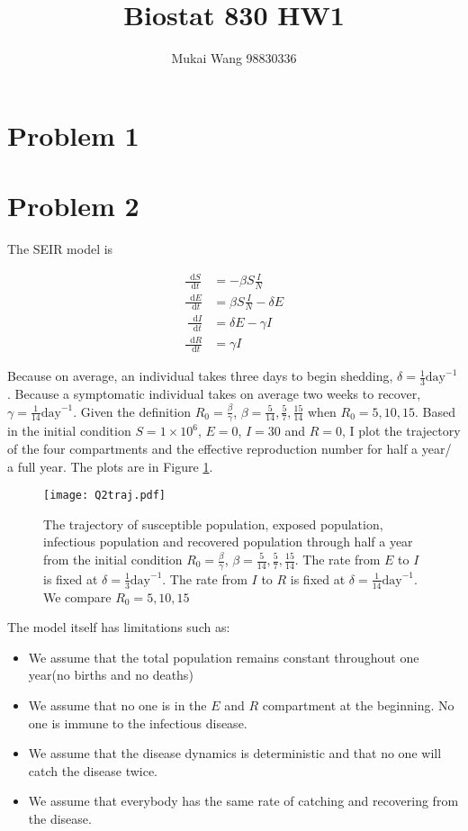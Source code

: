 \documentclass[12pt]{article}
\title{Biostat 830 HW1}
\date{}
\author{Mukai Wang 98830336}
\newcommand*\diff{\mathop{}\!\mathrm{d}}
\begin{document}
\maketitle

\section*{Problem 1}

\section*{Problem 2}

The SEIR model is

\begin{align*}
	\frac{\diff S}{\diff t} &= -\beta S \frac{I}{N}\\
	\frac{\diff E}{\diff t} &= \beta S \frac{I}{N} - \delta E\\\
	\frac{\diff I}{\diff t} &= \delta E - \gamma I\\
	\frac{\diff R}{\diff t} &= \gamma I
\end{align*}

Because on average, an individual takes three days to begin shedding, $\delta = \frac{1}{3} \text{day}^{-1}$. Because a symptomatic individual takes on average two weeks to recover, $\gamma = \frac{1}{14} \text{day}^{-1}$. Given the definition $R_{0} = \frac{\beta}{\gamma}$, $\beta = \frac{5}{14}, \frac{5}{7}, \frac{15}{14}$ when $R_{0} = 5, 10, 15$.
Based in the initial condition $S=1\times 10^6$, $E=0$, $I=30$ and $R=0$, I plot the trajectory of the four compartments and the effective reproduction number for half a year/ a full year. The plots are in Figure \ref{Q2traj}.

\begin{figure}[htbp]
	\centering
	\texttt{[image: Q2traj.pdf]}
	\caption{The trajectory of susceptible population, exposed population, infectious population and recovered population through half a year from the initial condition $R_{0} = \frac{\beta}{\gamma}$, $\beta = \frac{5}{14}, \frac{5}{7}, \frac{15}{14}$. The rate from $E$ to $I$ is fixed at $\delta=\frac{1}{3} \text{day}^{-1}$. The rate from $I$ to $R$ is fixed at $\delta=\frac{1}{14} \text{day}^{-1}$. We compare $R_0=5, 10, 15$}\label{Q2traj}
\end{figure}

The model itself has limitations such as:
\begin{itemize}
	\item We assume that the total population remains constant throughout one year(no births and no deaths)
	\item We assume that no one is in the $E$ and $R$ compartment at the beginning. No one is immune to the infectious disease.
	\item We assume that the disease dynamics is deterministic and that no one will catch the disease twice.
	\item We assume that everybody has the same rate of catching and recovering from the disease.
\end{itemize}
\end{document}
